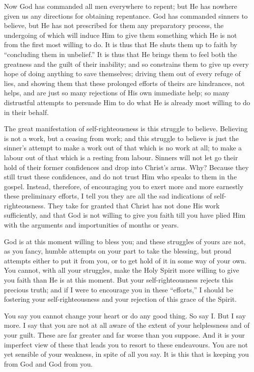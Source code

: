 \documentclass[
]{book}
\begin{document}
Now God has commanded all men everywhere to repent; but He has nowhere given us any directions for obtaining repentance. God has commanded sinners to believe, but He has not prescribed for them any preparatory process, the undergoing of which will induce Him to give them something which He is not from the first most willing to do. It is thus that He shuts them up to faith by ``concluding them in unbelief.'' It is thus that He brings them to feel both the greatness and the guilt of their inability; and so constrains them to give up every hope of doing anything to save themselves; driving them out of every refuge of lies, and showing them that these prolonged efforts of theirs are hindrances, not helps, and are just so many rejections of His own immediate help; so many distrustful attempts to persuade Him to do what He is already most willing to do in their behalf.

The great manifestation of self-righteousness is this struggle to believe. Believing is not a work, but a ceasing from work; and this struggle to believe is just the sinner's attempt to make a work out of that which is no work at all; to make a labour out of that which is a resting from labour. Sinners will not let go their hold of their former confidences and drop into Christ's arms. Why? Because they still trust these confidences, and do not trust Him who speaks to them in the gospel. Instead, therefore, of encouraging you to exert more and more earnestly these preliminary efforts, I tell you they are all the sad indications of self-righteousness. They take for granted that Christ has not done His work sufficiently, and that God is not willing to give you faith till you have plied Him with the arguments and importunities of months or years.

God is at this moment willing to bless you; and these struggles of yours are not, as you fancy, humble attempts on your part to take the blessing, but proud attempts either to put it from you, or to get hold of it in some way of your own. You cannot, with all your struggles, make the Holy Spirit more willing to give you faith than He is at this moment. But your self-righteousness rejects this precious truth; and if I were to encourage you in these ``efforts,'' I should be fostering your self-righteousness and your rejection of this grace of the Spirit.

You say you cannot change your heart or do any good thing. So say I. But I say more. I say that you are not at all aware of the extent of your helplessness and of your guilt. These are far greater and far worse than you suppose. And it is your imperfect view of these that leads you to resort to these endeavours. You are not yet sensible of your weakness, in spite of all you say. It is this that is keeping you from God and God from you.
\end{document}

